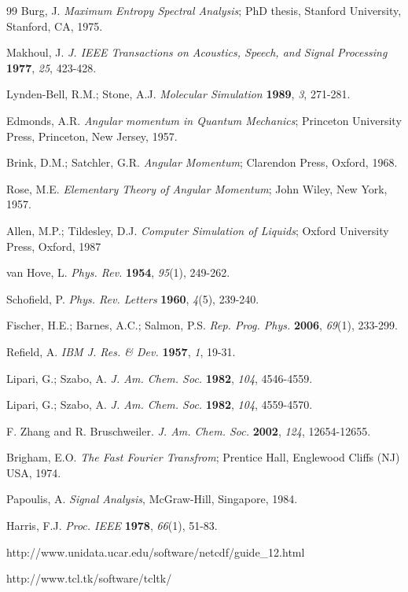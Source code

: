\documentclass[a4paper,11pt]{article}
\begin{document}
\begin{thebibliography}{99}
 Burg, J. \textit{Maximum Entropy Spectral Analysis}; PhD thesis, Stanford University, Stanford, CA, 1975.

 Makhoul, J. \textit{J. IEEE Transactions on Acoustics, Speech, and Signal Processing} \textbf{1977}, \textit{25}, 423-428.

 Lynden-Bell, R.M.; Stone, A.J. \textit{Molecular Simulation} \textbf{1989}, \textit{3}, 271-281.

 Edmonds, A.R. \textit{Angular momentum in Quantum Mechanics}; Princeton University Press, Princeton,
New Jersey, 1957.

 Brink, D.M.; Satchler, G.R. \textit{Angular Momentum}; Clarendon Press, Oxford, 1968.

 Rose, M.E. \textit{Elementary Theory of Angular Momentum}; John Wiley, New York, 1957.

 Allen, M.P.; Tildesley, D.J. \textit{Computer Simulation of Liquids}; Oxford University Press, Oxford, 1987

 van Hove, L. \textit{Phys.  Rev.} \textbf{1954}, \textit{95}(1), 249-262.

 Schofield, P. \textit{Phys. Rev. Letters} \textbf{1960}, \textit{4}(5), 239-240.

 Fischer, H.E.; Barnes, A.C.; Salmon, P.S. \textit{Rep. Prog. Phys.} \textbf{2006}, \textit{69}(1), 233-299.

 Refield, A. \textit{IBM J. Res. \& Dev.} \textbf{1957}, \textit{1}, 19-31.

 Lipari, G.; Szabo, A. \textit{J. Am. Chem. Soc.} \textbf{1982}, \textit{104}, 4546-4559.

 Lipari, G.; Szabo, A. \textit{J. Am. Chem. Soc.} \textbf{1982}, \textit{104}, 4559-4570.

 F. Zhang and R. Bruschweiler. \textit{J. Am. Chem. Soc.} \textbf{2002}, \textit{124}, 12654-12655.

 Brigham, E.O. \textit{The Fast Fourier Transfrom}; Prentice Hall, Englewood Cliffs (NJ) USA, 1974.

 Papoulis, A. \textit{Signal Analysis}, McGraw-Hill, Singapore, 1984.

 Harris, F.J. \textit{Proc. IEEE} \textbf{1978}, \textit{66}(1), 51-83.

 http://www.unidata.ucar.edu/software/netcdf/guide\_12.html

 http://www.tcl.tk/software/tcltk/

\end{thebibliography}
\end{document}
